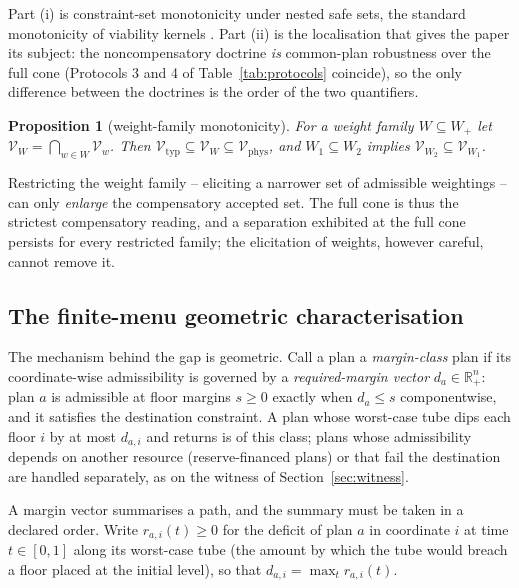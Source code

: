 \documentclass[preprint,11pt,authoryear]{elsarticle}
\newtheorem{proposition}{Proposition}
\theoremstyle{definition}
\theoremstyle{remark}
\newcommand{\Vtyp}{\mathcal{V}_{\mathrm{typ}}}
\newcommand{\Vphys}{\mathcal{V}_{\mathrm{phys}}}
\newcommand{\Wp}{W_+}
\newcommand{\Rp}{\mathbb{R}^n_+}
\begin{document}
Part (i) is constraint-set monotonicity under nested safe sets, the standard monotonicity of viability kernels \citep{Aubin1991,Frankowska1989}. Part (ii) is the localisation that gives the paper its subject: the noncompensatory doctrine \emph{is} common-plan robustness over the full cone (Protocols 3 and 4 of Table~\ref{tab:protocols} coincide), so the only difference between the doctrines is the order of the two quantifiers.

\begin{proposition}[weight-family monotonicity]\label{prop:monotone}
For a weight family $W\subseteq\Wp$ let $\mathcal V_W=\bigcap_{w\in W}\mathcal V_w$. Then $\Vtyp\subseteq\mathcal V_W\subseteq\Vphys$, and $W_1\subseteq W_2$ implies $\mathcal V_{W_2}\subseteq\mathcal V_{W_1}$.
\end{proposition}

Restricting the weight family -- eliciting a narrower set of admissible weightings -- can only \emph{enlarge} the compensatory accepted set. The full cone is thus the strictest compensatory reading, and a separation exhibited at the full cone persists for every restricted family; the elicitation of weights, however careful, cannot remove it.

\subsection{The finite-menu geometric characterisation}

The mechanism behind the gap is geometric. Call a plan a \emph{margin-class} plan if its coordinate-wise admissibility is governed by a \emph{required-margin vector} $d_a\in\Rp$: plan $a$ is admissible at floor margins $s\ge0$ exactly when $d_a\le s$ componentwise, and it satisfies the destination constraint. A plan whose worst-case tube dips each floor $i$ by at most $d_{a,i}$ and returns is of this class; plans whose admissibility depends on another resource (reserve-financed plans) or that fail the destination are handled separately, as on the witness of Section~\ref{sec:witness}.

A margin vector summarises a path, and the summary must be taken in a declared order. Write $r_{a,i}(t)\ge0$ for the deficit of plan $a$ in coordinate $i$ at time $t\in[0,1]$ along its worst-case tube (the amount by which the tube would breach a floor placed at the initial level), so that $d_{a,i}=\max_t r_{a,i}(t)$.
\end{document}
